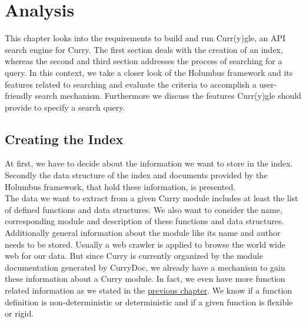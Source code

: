 \documentclass[%
	pdftex,%
	a4paper,%
	oneside,%
	chapterprefix,%
	headsepline,%
	12pt%
]{scrbook}
\begin{document}

\chapter{Analysis}\label{analysis}
This chapter looks into the requirements to build and run Curr(y)gle,
an API search engine for Curry. %
The first section deals with the creation of an index, whereas the
second and third section addresses the process of searching for a
query. %
In this context, we take a closer look of the Holumbus framework and
its features related to searching and evaluate the criteria to
accomplish a user-friendly search mechanism. %
Furthermore we discuss the features Curr(y)gle should provide to
specify a search query. %




\section{Creating the Index}
At first, we have to decide about the information we want to store in
the index. %
Secondly the data structure of the index and documents provided by the
Holumbus framework, that hold these information, is presented.\\

The data we want to extract from a given Curry module includes at
least the list of defined functions and data structures. %
We also want to consider the name, corresponding module and
description of these functions and data structures. %
Additionally general information about the module like its name and
author needs to be stored. %
Usually a web crawler is applied to browse the world wide web for our
data. %
But since Curry is currently organized by the module documentation
generated by CurryDoc, we already have a mechanism to gain these
information about a Curry module. %
In fact, we even have more function related information as we stated
in the \hyperref[preliminaries:curryInfo]{previous chapter}. %
We know if a function definition is non-deterministic or deterministic
and if a given function is flexible or rigid. %
\end{document}
